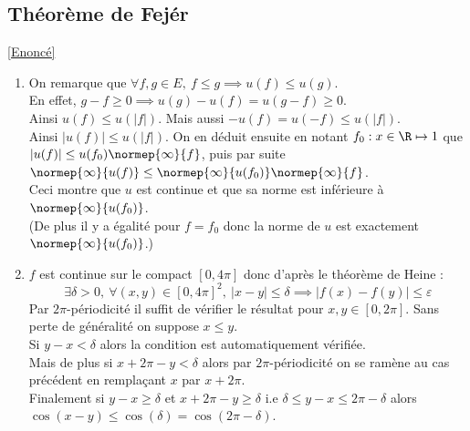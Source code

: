 \documentclass{book}
\begin{document}
	\subsection{Théorème de Fejér }
	\label{Théorème de Fejér corrigé}
	\textcolor{blue}{\hyperref[Théorème de Fejér]{[Enoncé]}}\\
	\begin{enumerate}[leftmargin=*]
		\item On remarque que $\forall f,g\in E,\ f\leq g\implies u(f)\leq u(g)$.\\
		En effet, $g-f\geq 0\implies u(g)-u(f)=u(g-f)\geq 0$.\\
		Ainsi $u(f)\leq u(|f|)$. Mais aussi $-u(f)=u(-f)\leq u(|f|)$.\\
		Ainsi $|u(f)|\leq u(|f|)$. On en déduit ensuite en notant $f_0:x\in \R\mapsto 1$ que $|u(f)|\leq u(f_0)\normep{\infty}{f}$, puis par suite $\normep{\infty}{u(f)}\leq \normep{\infty}{u(f_0)}\normep{\infty}{f}$.\\
		Ceci montre que $u$ est continue et que sa norme est inférieure à $\normep{\infty}{u(f_0)}$.\\
		(De plus il y a égalité pour $f=f_0$ donc la norme de $u$ est exactement $\normep{\infty}{u(f_0)}$.)
		\item $f$ est continue sur le compact $[0,4\pi]$ donc d'après le théorème de Heine :
		$$\exists \delta>0,\ \forall (x,y)\in [0,4\pi]^2,\ |x-y|\leq \delta\implies |f(x)-f(y)|\leq \varepsilon$$
		Par $2\pi$-périodicité il suffit de vérifier le résultat pour $x,y\in [0,2\pi]$. Sans perte de généralité on suppose $x\leq y$.\\
		Si $y-x<\delta$ alors la condition est automatiquement vérifiée.\\
		Mais de plus si $x+2\pi-y<\delta$ alors par $2\pi$-périodicité on se ramène au cas précédent en remplaçant $x$ par $x+2\pi$.\\
		Finalement si $y-x\geq \delta$ et $x+2\pi-y\geq \delta$ i.e $\delta\leq y-x\leq 2\pi-\delta$ alors $\cos(x-y)\leq \cos(\delta)=\cos(2\pi-\delta)$.\\
		\begin{center}
\end{center}
\end{enumerate}
\end{document}
